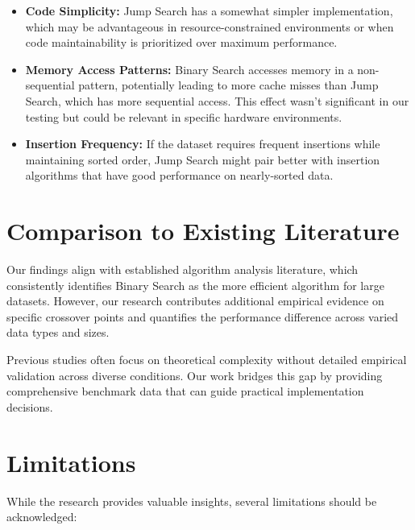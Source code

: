 \begin{itemize}
    \item \textbf{Code Simplicity:} Jump Search has a somewhat simpler implementation, which may be advantageous in resource-constrained environments or when code maintainability is prioritized over maximum performance.
    
    \item \textbf{Memory Access Patterns:} Binary Search accesses memory in a non-sequential pattern, potentially leading to more cache misses than Jump Search, which has more sequential access. This effect wasn't significant in our testing but could be relevant in specific hardware environments.
    
    \item \textbf{Insertion Frequency:} If the dataset requires frequent insertions while maintaining sorted order, Jump Search might pair better with insertion algorithms that have good performance on nearly-sorted data.
\end{itemize}

\section{Comparison to Existing Literature}

Our findings align with established algorithm analysis literature, which consistently identifies Binary Search as the more efficient algorithm for large datasets. However, our research contributes additional empirical evidence on specific crossover points and quantifies the performance difference across varied data types and sizes.

Previous studies often focus on theoretical complexity without detailed empirical validation across diverse conditions. Our work bridges this gap by providing comprehensive benchmark data that can guide practical implementation decisions.

\section{Limitations}

While the research provides valuable insights, several limitations should be acknowledged:

